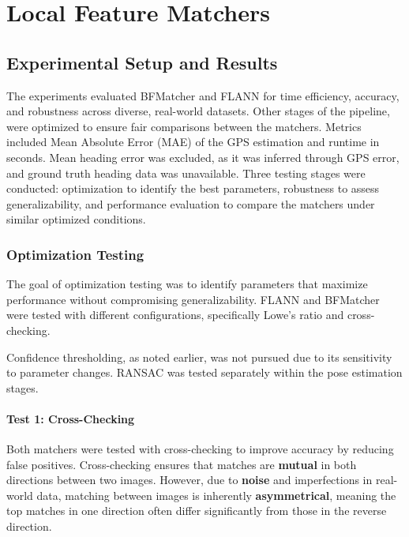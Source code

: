 \chapter{Local Feature Matchers}










\section{Experimental Setup and Results}

The experiments evaluated BFMatcher and FLANN for time efficiency, accuracy, and robustness across diverse, real-world datasets. Other stages of the pipeline, were optimized to ensure fair comparisons between the matchers.
Metrics included Mean Absolute Error (MAE) of the GPS estimation and runtime in seconds. Mean heading error was excluded, as it was inferred through GPS error, and ground truth heading data was unavailable. 
Three testing stages were conducted: optimization to identify the best parameters, robustness to assess generalizability, and performance evaluation to compare the matchers under similar optimized conditions.


\subsection*{Optimization Testing}
The goal of optimization testing was to identify parameters that maximize performance without compromising generalizability. FLANN and BFMatcher were tested with different configurations, specifically Lowe’s ratio and cross-checking. 

Confidence thresholding, as noted earlier, was not pursued due to its sensitivity to parameter changes. RANSAC was tested separately within the pose estimation stages.

\subsubsection*{Test 1: Cross-Checking}

Both matchers were tested with cross-checking to improve accuracy by reducing false positives. Cross-checking ensures that matches are \textbf{mutual} in both directions between two images. However, due to \textbf{noise} and imperfections in real-world data, matching between images is inherently \textbf{asymmetrical}, meaning the top matches in one direction often differ significantly from those in the reverse direction.

